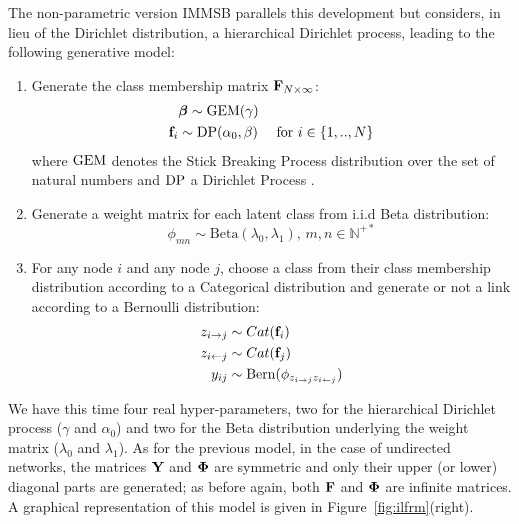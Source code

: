 The non-parametric version IMMSB parallels this development but considers, in lieu of the Dirichlet distribution, a hierarchical Dirichlet process, leading to the following generative model:
%
\begin{enumerate}
\item Generate the class membership matrix $\mathbf{F}_{N \times \infty}$:
   \begin{align}
    &\bm{\beta} \sim \mathrm{GEM}(\gamma) \nonumber \\
    \mathbf{f}_i &\sim \mathrm{DP}(\alpha_0, \beta) \quad\textnormal{ for }  i \in \{1, .., N\} \nonumber
   \end{align}
where $\mathrm{GEM}$ denotes the Stick Breaking Process distribution over the set of natural numbers and $\mathrm{DP}$ a Dirichlet Process  \cite{HDP}.
\item Generate a weight matrix for each latent class from i.i.d Beta distribution:\\
\[ \phi_{mn} \sim \mathrm{Beta}(\lambda_0,\lambda_1), \, m,n \in \mathbb{N}^{+*} \]
\item For any node $i$ and any node $j$, choose a class from their class membership distribution according to a Categorical distribution and generate or not a link according to a Bernoulli distribution:
   \begin{align}
    z_{i \rightarrow j} &\sim \mbox{Cat}(\mat{f}_i) \nonumber \\
    z_{i \leftarrow j} &\sim \mbox{Cat}(\mat{f}_j) \nonumber \\
    y_{ij} &\sim \mathrm{Bern}(\phi_{z_{i \rightarrow j}z_{i \leftarrow j}})
    \label{eq:link-immsb}
   \end{align}
\end{enumerate}
%
We have this time four real hyper-parameters, two for the hierarchical Dirichlet process ($\gamma$ and $\alpha_0$) and two for the Beta distribution underlying the weight matrix ($\lambda_0$ and $\lambda_1$). As for the previous model, in the case of undirected networks, the matrices $\mathbf{Y}$ and $\mathbf{\Phi}$ are symmetric and only their upper (or lower) diagonal parts are generated; as before again, both $\mathbf{F}$ and $\mathbf{\Phi}$ are infinite matrices. A graphical representation of this model is given in Figure~\ref{fig:ilfrm}(right).


